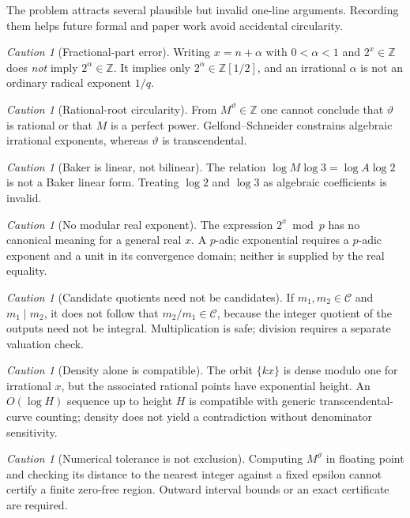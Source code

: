 \documentclass[11pt,oneside]{article}
\theoremstyle{definition}
\theoremstyle{remark}
\newtheorem{warning}[theorem]{Caution}
\newcommand{\Z}{\mathbb Z}
\newcommand{\Cand}{\mathcal C}
\begin{document}
The problem attracts several plausible but invalid one-line arguments.  Recording them helps
future formal and paper work avoid accidental circularity.

\begin{warning}[Fractional-part error]
Writing $x=n+\alpha$ with $0<\alpha<1$ and $2^x\in\Z$ does \emph{not} imply
$2^\alpha\in\Z$.  It implies only $2^\alpha\in\Z[1/2]$, and an irrational $\alpha$ is not an
ordinary radical exponent $1/q$.
\end{warning}

\begin{warning}[Rational-root circularity]
From $M^{\vartheta}\in\Z$ one cannot conclude that $\vartheta$ is rational or that $M$ is a
perfect power.  Gelfond--Schneider constrains algebraic irrational exponents, whereas
$\vartheta$ is transcendental.
\end{warning}

\begin{warning}[Baker is linear, not bilinear]
The relation
$\log M\log3=\log A\log2$ is not a Baker linear form.  Treating $\log2$ and $\log3$ as
algebraic coefficients is invalid.
\end{warning}

\begin{warning}[No modular real exponent]
The expression $2^x\bmod p$ has no canonical meaning for a general real $x$.  A $p$-adic
exponential requires a $p$-adic exponent and a unit in its convergence domain; neither is
supplied by the real equality.
\end{warning}

\begin{warning}[Candidate quotients need not be candidates]
If $m_1,m_2\in\Cand$ and $m_1\mid m_2$, it does not follow that $m_2/m_1\in\Cand$, because the
integer quotient of the outputs need not be integral.  Multiplication is safe; division
requires a separate valuation check.
\end{warning}

\begin{warning}[Density alone is compatible]
The orbit $\{kx\}$ is dense modulo one for irrational $x$, but the associated rational points
have exponential height.  An $O(\log H)$ sequence up to height $H$ is compatible with generic
transcendental-curve counting; density does not yield a contradiction without denominator
sensitivity.
\end{warning}

\begin{warning}[Numerical tolerance is not exclusion]
Computing $M^{\vartheta}$ in floating point and checking its distance to the nearest integer
against a fixed epsilon cannot certify a finite zero-free region.  Outward interval bounds or
an exact certificate are required.
\end{warning}
\end{document}
